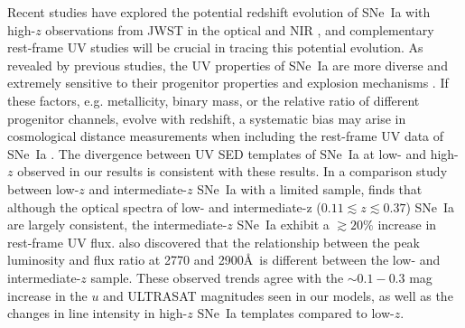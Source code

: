 \documentclass[twocolumn,tighten,times,floatfix]{aastex631}
\newcommand{\redpen}[1]{{\textbf{\textcolor{red}{#1}}}}
\begin{document}
Recent studies have explored the potential redshift evolution of SNe~Ia with high-$z$ observations from JWST in the optical and NIR \citep{Pierel24b, Pierel25}, and complementary rest-frame UV studies will be crucial in tracing this potential evolution. 
As revealed by previous studies, the UV properties of SNe~Ia are more diverse and extremely sensitive to their progenitor properties and explosion mechanisms \citep{foley16, Milne2015}. 
If these factors, e.g. metallicity, binary mass, or the relative ratio of different progenitor channels, evolve with redshift, a systematic bias may arise in cosmological distance measurements when including the rest-frame UV data of SNe~Ia \citep{Milne2015}. 
The divergence between UV SED templates of SNe~Ia at low- and high-$z$ observed in our results is consistent with these results.
In a comparison study between low-$z$ and intermediate-$z$ SNe~Ia with a limited sample, \cite{Foley12a} finds that although the optical spectra of low- and intermediate-z ($0.11\lesssim z \lesssim0.37$) SNe~Ia are largely consistent, the intermediate-$z$ SNe~Ia exhibit a $\gtrsim20\%$ increase in rest-frame UV flux. \cite{Foley12a} also discovered that the relationship between the peak luminosity and flux ratio at 2770 and 2900\AA\ is different between the low- and intermediate-$z$ sample. %
These observed trends agree with the $\sim0.1-0.3$ mag increase in the $u$ and ULTRASAT magnitudes seen in our models, as well as the changes in line intensity in high-$z$ SNe~Ia templates compared to low-$z$. 
\end{document}
